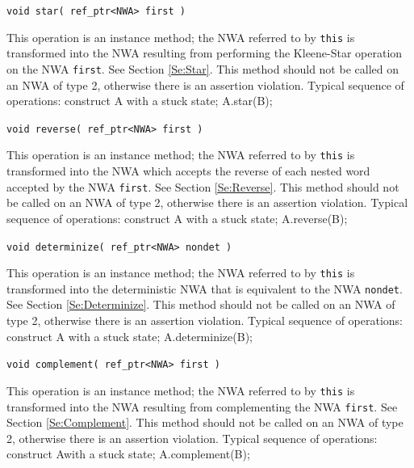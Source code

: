 \documentclass{llncs}
\begin{document}
\begin{description}
  \item\texttt{void star( ref\_ptr<NWA> first )} \nopagebreak

    This operation is an instance method; the NWA referred to by \texttt{this} is transformed into the NWA resulting from performing the Kleene-Star operation on the NWA \texttt{first}.  See Section \ref{Se:Star}.  This method should not be called on an NWA of type 2, otherwise there is an assertion violation.  Typical sequence of operations: construct A with a stuck state; A.star(B);

  \item\texttt{void reverse( ref\_ptr<NWA> first )} \nopagebreak

    This operation is an instance method; the NWA referred to by \texttt{this} is transformed into the NWA which accepts the reverse of each nested word accepted by the NWA \texttt{first}.  See Section \ref{Se:Reverse}.  This method should not be called on an NWA of type 2, otherwise there is an assertion violation.  Typical sequence of operations: construct A with a stuck state; A.reverse(B);

  \item\texttt{void determinize( ref\_ptr<NWA> nondet )} \nopagebreak

    This operation is an instance method; the NWA referred to by \texttt{this} is transformed into the deterministic NWA that is equivalent to the NWA \texttt{nondet}.  See Section \ref{Se:Determinize}.  This method should not be called on an NWA of type 2, otherwise there is an assertion violation.  Typical sequence of operations: construct A with a stuck state; A.determinize(B);

  \item\texttt{void complement( ref\_ptr<NWA> first )} \nopagebreak

    This operation is an instance method; the NWA referred to by \texttt{this} is transformed into the NWA resulting from complementing the NWA \texttt{first}.  See Section \ref{Se:Complement}.  This method should not be called on an NWA of type 2, otherwise there is an assertion violation.  Typical sequence of operations: construct Awith a stuck state; A.complement(B);

\end{description}
\end{document}
